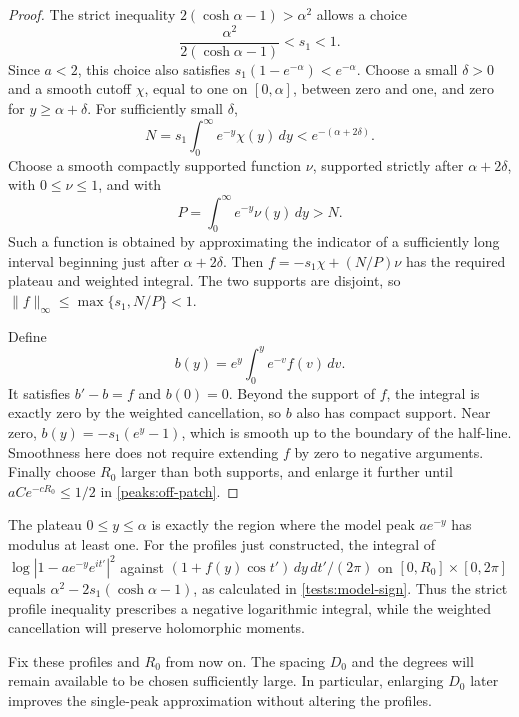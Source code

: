 \begin{proof}
The strict inequality $2(\cosh\alpha-1)>\alpha^2$ allows a choice
\[
 \frac{\alpha^2}{2(\cosh\alpha-1)}<s_1<1.
\]
Since $a<2$, this choice also satisfies
$s_1(1-e^{-\alpha})<e^{-\alpha}$.
Choose a small $\delta>0$ and a smooth cutoff $\chi$, equal to one
on $[0,\alpha]$, between zero and one, and zero for
$y\ge\alpha+\delta$.  For sufficiently small $\delta$,
\[
 N=s_1\int_0^\infty e^{-y}\chi(y)\,dy
 <e^{-(\alpha+2\delta)}.
\]
Choose a smooth compactly supported function $\nu$, supported
strictly after $\alpha+2\delta$, with $0\le\nu\le1$, and with
\[
 P=\int_0^\infty e^{-y}\nu(y)\,dy>N.
\]
Such a function is obtained by approximating the indicator of a
sufficiently long interval beginning just after $\alpha+2\delta$.
Then $f=-s_1\chi+(N/P)\nu$ has the required plateau and weighted
integral.  The two supports are disjoint, so
$\|f\|_\infty\le\max\{s_1,N/P\}<1$.

Define
\[
 b(y)=e^y\int_0^y e^{-v}f(v)\,dv.
\]
It satisfies $b'-b=f$ and $b(0)=0$.  Beyond the support of $f$,
the integral is exactly zero by the weighted cancellation, so $b$
also has compact support.  Near zero,
$b(y)=-s_1(e^y-1)$, which is smooth up to the boundary of the
half-line.  Smoothness here does not require extending $f$ by zero
to negative arguments.  Finally choose $R_0$ larger than both
supports, and enlarge it further until
$aCe^{-cR_0}\le1/2$ in \eqref{peaks:off-patch}.
\end{proof}

The plateau $0\le y\le\alpha$ is exactly the region where the
model peak $ae^{-y}$ has modulus at least one.  For the profiles
just constructed, the integral of
$\log|1-ae^{-y}e^{it'}|^2$ against
$(1+f(y)\cos t')\,dy\,dt'/(2\pi)$ on
$[0,R_0]\times[0,2\pi]$ equals
$\alpha^2-2s_1(\cosh\alpha-1)$, as calculated in
\eqref{tests:model-sign}.  Thus the strict profile inequality
prescribes a negative logarithmic integral, while the weighted
cancellation will preserve holomorphic moments.

Fix these profiles and $R_0$ from now on.  The spacing $D_0$ and
the degrees will remain available to be chosen sufficiently large.
In particular, enlarging $D_0$ later improves the single-peak
approximation without altering the profiles.
